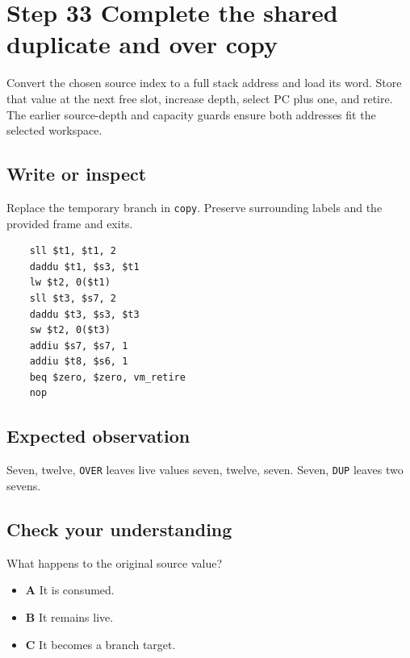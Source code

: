 \section{Step 33 Complete the shared duplicate and over copy}\label{vm-s33}

Convert the chosen source index to a full stack address and load its word. Store that value at the next free slot, increase depth, select PC plus one, and retire. The earlier source-depth and capacity guards ensure both addresses fit the selected workspace.

\subsection{Write or inspect}
Replace the temporary branch in \texttt{copy}. Preserve surrounding labels and the provided frame and exits.

\begin{verbatim}
    sll $t1, $t1, 2
    daddu $t1, $s3, $t1
    lw $t2, 0($t1)
    sll $t3, $s7, 2
    daddu $t3, $s3, $t3
    sw $t2, 0($t3)
    addiu $s7, $s7, 1
    addiu $t8, $s6, 1
    beq $zero, $zero, vm_retire
    nop
\end{verbatim}
\subsection{Expected observation}
Seven, twelve, \texttt{OVER} leaves live values seven, twelve, seven. Seven, \texttt{DUP} leaves two sevens.

\subsection{Check your understanding}
What happens to the original source value?

\begin{itemize}
  \item \textbf{A} It is consumed.
  \item \textbf{B} It remains live.
  \item \textbf{C} It becomes a branch target.
\end{itemize}

